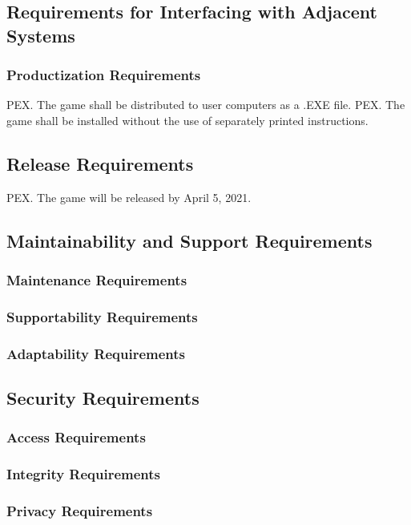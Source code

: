 \documentclass{article}
\begin{document}
\subsection{Requirements for Interfacing with Adjacent Systems}
    \subsubsection{Productization Requirements}
    PEX. The game shall be distributed to user computers as a .EXE file.
    PEX. The game shall be installed without the use of separately printed instructions.
    
 \subsection{Release Requirements}
    PEX. The game will be released by April 5, 2021.
    
 \subsection{Maintainability and Support Requirements}
    \subsubsection{Maintenance Requirements}
    \subsubsection{Supportability Requirements}
    \subsubsection{Adaptability Requirements}
    
\subsection{Security Requirements}
    \subsubsection{Access Requirements}
    \subsubsection{Integrity Requirements}
    \subsubsection{Privacy Requirements}
\end{document}

